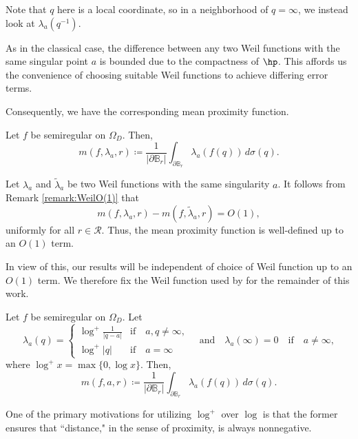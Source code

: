 \documentclass{amsart}
\begin{document}
Note that $q$ here is a local coordinate, so in a neighborhood of $q=\infty$, we instead look at $\lambda_a(q^{-1})$. 

\begin{remark}\label{remark:WeilO(1)}
    As in the classical case, the difference between any two Weil functions with the same singular point $a$ is bounded due to the compactness of $\hp$. This affords us the convenience of choosing suitable Weil functions to achieve differing error terms.
\end{remark}

Consequently, we have the corresponding mean proximity function. 

\begin{defin}
Let $f$ be semiregular on $\Omega_D$. Then, \[m(f,\lambda_a,r)\coloneq \frac{1}{|\partial \mathbb B_r|}\int_{\partial \mathbb B_r}\lambda_a(f(q))\,d\sigma(q).\]
\end{defin}

\begin{remark}\label{remark:m(f,lambda_a,r)O(1)}
Let $\lambda_a$ and $\tilde\lambda_a$ be two Weil functions with the same singularity $a$. 
It follows from Remark \ref{remark:WeilO(1)} that
\[
m(f,\lambda_a,r)-m(f,\tilde\lambda_a,r)=O(1),
\]
uniformly for all $r\in\mathcal R$. Thus, the mean proximity function is well-defined up to an $O(1)$ term.
\end{remark}

In view of this, our results will be independent of choice of Weil function up to an $O(1)$ term. We therefore fix the Weil function used by \cite{Nevanlinna1925} for the remainder of this work. 

\begin{defin}\label{def:AnalMPF}
Let $f$ be semiregular on $\Omega_D$. Let 
\[\lambda_a(q)=\begin{cases}
        \log^+\frac1{|q-a|}  &\text{if} \quad  a,q\neq \infty, \\\log^+ |q| &\text{if} \quad a=\infty 
    \end{cases} \quad \text{and} \quad \lambda_a(\infty)=0 \quad \text{if} \quad a\neq\infty,\] where $\log^+x=\max\{0,\log x\}$.
Then, \[m(f,a,r)\coloneq \frac{1}{|\partial \mathbb B_r|}\int_{\partial \mathbb B_r}\lambda_a(f(q))\,d\sigma(q).\]
\end{defin}

One of the primary motivations for utilizing $\log^+$ over $\log$ is that the former ensures that ``distance," in the sense of proximity, is always nonnegative. 
\end{document}

